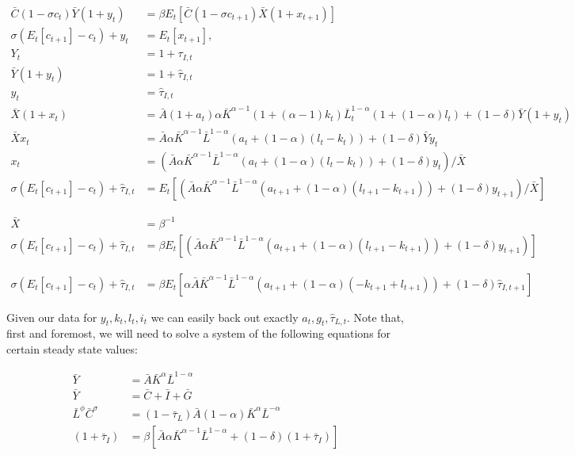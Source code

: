 \documentclass[11pt]{article} %
\begin{document}
\begin{align*}
\bar{C}(1- \sigma c_t )\bar{Y}(1+y_t) &= \beta E_t[\bar{C}(1- \sigma c_{t+1})\bar{X}(1+x_{t+1})]\\
\sigma(E_t[c_{t+1}] - c_t) + y_t &= E_t[x_{t+1}], \\
Y_t &= 1+\tau_{I,t}\\
\bar{Y}(1+y_t) &= 1 + \hat{\tau}_{I,t}\\
y_t &= \hat{\tau}_{I,t}\\
\bar{X}(1+x_t) &= \bar{A}(1+a_{t})\alpha \bar{K}^{\alpha-1}(1+(\alpha-1)k_{t}) \bar{L}_{t}^{1-\alpha}(1+(1-\alpha)l_t) + (1-\delta)\bar{Y}(1+y_t) \\
\bar{X}x_t &= \bar{A}\alpha \bar{K}^{\alpha-1} \bar{L}^{1-\alpha}(a_t +(1-\alpha)(l_t - k_t)) + (1-\delta)\bar{Y}y_t\\
x_t &= (\bar{A}\alpha \bar{K}^{\alpha-1} \bar{L}^{1-\alpha}(a_t +(1-\alpha)(l_t - k_t)) + (1-\delta)y_t)/\bar{X}\\
\sigma(E_t[c_{t+1}] - c_t) +  \hat{\tau}_{I,t} &= E_t[ (\bar{A}\alpha \bar{K}^{\alpha-1} \bar{L}^{1-\alpha}(a_{t+1} +(1-\alpha)(l_{t+1} - k_{t+1})) + (1-\delta)y_{t+1})/\bar{X}]
\end{align*}

\begin{align*}
\bar{X} &= \beta^{-1}\\
 \sigma(E_t[c_{t+1}] - c_t) + \hat{\tau}_{I,t} &=\beta E_t[ (\bar{A}\alpha \bar{K}^{\alpha-1} \bar{L}^{1-\alpha}(a_{t+1} +(1-\alpha)(l_{t+1} - k_{t+1})) + (1-\delta)y_{t+1})]
\end{align*}

\begin{align}
 \sigma(E_t[c_{t+1}]-  c_t) + \hat{\tau}_{I,t} &= \beta E_t\left[\alpha\bar{A} \bar{K}^{\alpha - 1} \bar{L}^{1-\alpha}(a_{t+1} + (1-\alpha)(- k_{t+1} + l_{t+1})) + (1-\delta)\hat{\tau}_{I,t+1} \right] \label{ee}
\end{align}

Given our data for $y_t,k_t,l_t,i_t$ we can easily back out exactly $a_t, g_t, \hat{\tau}_{L,t}$. Note that, first and foremost, we will need to solve a system of the following equations for certain steady state values:

\begin{align*}
\bar{Y} &= \bar{A}\bar{K}^{\alpha}\bar{L}^{1-\alpha} \\
\bar{Y} &= \bar{C} + \bar{I} + \bar{G}\\
\bar{L}^{\phi}\bar{C}^{\sigma} &= (1-\bar{\tau}_{L})\bar{A}(1-\alpha) \bar{K}^{\alpha}\bar{L}^{-\alpha} \\
(1+\bar{\tau}_{I}) &= \beta [\bar{A}\alpha \bar{K}^{\alpha-1}\bar{L}^{1-\alpha} + (1-\delta)(1+\bar{\tau}_{I})]
\end{align*}
\end{document}
